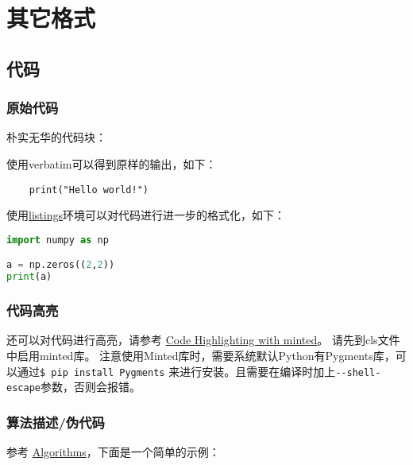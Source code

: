 
\chapter{其它格式}
\section{代码}
\subsection{原始代码}
朴实无华的代码块：

使用verbatim可以得到原样的输出，如下：

\begin{verbatim}
    print("Hello world!")
\end{verbatim}

使用\href{https://en.wikibooks.org/wiki/LaTeX/Source_Code_Listings}{listings}环境可以对代码进行进一步的格式化，如下：

\lstset{basicstyle=\ttfamily,breaklines=true}
\begin{lstlisting}[language=Python,frame=single]
import numpy as np

a = np.zeros((2,2))
print(a)
\end{lstlisting}

\subsection{代码高亮}
还可以对代码进行高亮，请参考 \href{https://www.overleaf.com/learn/latex/Code_Highlighting_with_minted}{Code Highlighting with minted}。
请先到cls文件中启用minted库。
注意使用Minted库时，需要系统默认Python有Pygments库，可以通过\verb|$ pip install Pygments| 来进行安装。且需要在编译时加上\verb|--shell-escape|参数，否则会报错。



\subsection{算法描述/伪代码}
参考 \href{https://en.wikibooks.org/wiki/LaTeX/Algorithms}{Algorithms}，下面是一个简单的示例：

